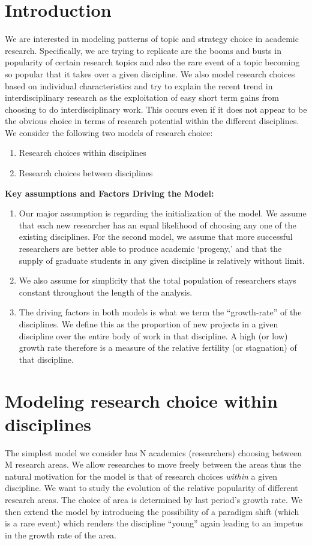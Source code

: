\documentclass[letterpaper]{article} %
\begin{document}
\section*{Introduction}
We are interested in modeling patterns of topic and strategy choice in academic research. Specifically, we are trying to replicate are the booms and busts in popularity of certain research topics and also the rare event of a topic becoming so popular that it takes over a given discipline. We also model research choices based on individual characteristics and try to explain the recent trend in interdisciplinary research as the exploitation of easy short term gains from choosing to do interdisciplinary work. This occurs even if it does not appear to be the obvious choice in terms of research potential within the different disciplines.
\newline  
\newline
We consider the following two models of research choice:
\begin{enumerate}
\item
Research choices within disciplines
\item
Research choices between disciplines
\end{enumerate}
\textbf{Key assumptions and Factors Driving the Model:}
\begin{enumerate}
\item
Our major assumption is regarding the initialization of the model. We assume that each new researcher has an equal likelihood of choosing any one of the existing disciplines. For the second model, we assume that more successful researchers are better able to produce academic `progeny,' and that the supply of graduate students in any given discipline is relatively without limit.
\item
We also assume for simplicity that the total population of researchers stays constant throughout the length of the analysis. 
\item
The driving factors in both models is what we term the ``growth-rate'' of the disciplines. We define this as the proportion of new projects in a given discipline over the entire body of work in that discipline. A high (or low) growth rate therefore is a measure of the relative fertility (or stagnation) of that discipline.  
\end{enumerate}
\textbf{}

\section{Modeling research choice within disciplines}
The simplest model we consider has N academics (researchers) choosing between M research areas. We allow researches to move freely between the areas thus the natural motivation for the model is that of research choices \textit{within} a given discipline. We want to study the evolution of the relative popularity of different research areas. The choice of area is determined by last period's growth rate. We then extend the model by introducing the possibility of a paradigm shift (which is a rare event) which renders the discipline ``young'' again leading to an impetus in the growth rate of the area.  
\newpage
\end{document}

